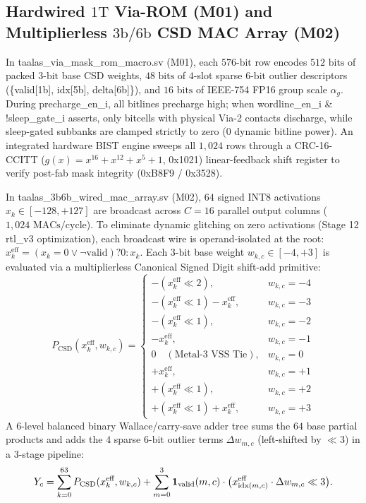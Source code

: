 \documentclass[10pt,journal,compsoc]{IEEEtran}
\def\texttt#1{#1}%
\begin{document}
\subsection{Hardwired $1\text{T}$ Via-ROM (\texttt{M01}) and Multiplierless $3\text{b}/6\text{b}$ CSD MAC Array (\texttt{M02})}
In \texttt{taalas\_via\_mask\_rom\_macro.sv} (\texttt{M01}), each $576\text{-bit}$ row encodes $512\text{ bits}$ of packed $3\text{-bit}$ base CSD weights, $48\text{ bits}$ of $4$-slot sparse $6\text{-bit}$ outlier descriptors (\texttt{\{valid[1b], idx[5b], delta[6b]\}}), and $16\text{ bits}$ of IEEE-754 \texttt{FP16} group scale $\alpha_g$. During \texttt{precharge\_en\_i}, all bitlines precharge high; when \texttt{wordline\_en\_i \& !sleep\_gate\_i} asserts, only bitcells with physical \texttt{Via-2} contacts discharge, while sleep-gated subbanks are clamped strictly to zero (\texttt{0} dynamic bitline power). An integrated hardware BIST engine sweeps all $1,024$ rows through a \texttt{CRC-16-CCITT} ($g(x)=x^{16}+x^{12}+x^5+1$, \texttt{0x1021}) linear-feedback shift register to verify post-fab mask integrity (\texttt{0xB8F9} / \texttt{0x3528}).

In \texttt{taalas\_3b6b\_wired\_mac\_array.sv} (\texttt{M02}), $64$ signed \texttt{INT8} activations $x_k \in [-128,+127]$ are broadcast across $C=16$ parallel output columns ($1,024\text{ MACs/cycle}$). To eliminate dynamic glitching on zero activations (\texttt{Stage 12} \texttt{rtl\_v3} optimization), each broadcast wire is operand-isolated at the root: $x_k^{\text{eff}} = (x_k = 0 \lor \neg\text{valid}) ? 0 : x_k$. Each $3\text{-bit}$ base weight $w_{k,c} \in [-4,+3]$ is evaluated via a multiplierless Canonical Signed Digit shift-add primitive:
\begin{equation}
P_{\text{CSD}}(x_k^{\text{eff}}, w_{k,c}) =
\begin{cases}
-(x_k^{\text{eff}} \ll 2), & w_{k,c} = -4 \\
-(x_k^{\text{eff}} \ll 1) - x_k^{\text{eff}}, & w_{k,c} = -3 \\
-(x_k^{\text{eff}} \ll 1), & w_{k,c} = -2 \\
-x_k^{\text{eff}}, & w_{k,c} = -1 \\
0\quad (\text{Metal-3 VSS Tie}), & w_{k,c} = 0 \\
+x_k^{\text{eff}}, & w_{k,c} = +1 \\
+(x_k^{\text{eff}} \ll 1), & w_{k,c} = +2 \\
+(x_k^{\text{eff}} \ll 1) + x_k^{\text{eff}}, & w_{k,c} = +3
\end{cases}
\label{eq:csd_prim}
\end{equation}
A $6$-level balanced binary Wallace/carry-save adder tree sums the $64$ base partial products and adds the $4$ sparse $6\text{-bit}$ outlier terms $\Delta w_{m,c}$ (left-shifted by $\ll 3$) in a $3$-stage pipeline:
\begin{equation}
\resizebox{0.88\columnwidth}{!}{$\displaystyle Y_c = \sum_{k=0}^{63} P_{\text{CSD}}(x_k^{\text{eff}}, w_{k,c}) + \sum_{m=0}^{3} \mathbf{1}_{\text{valid}}(m,c)\cdot\bigl(x_{\text{idx}(m,c)}^{\text{eff}}\cdot\Delta w_{m,c} \ll 3\bigr).$}
\label{eq:csd_sum}
\end{equation}
\end{document}
